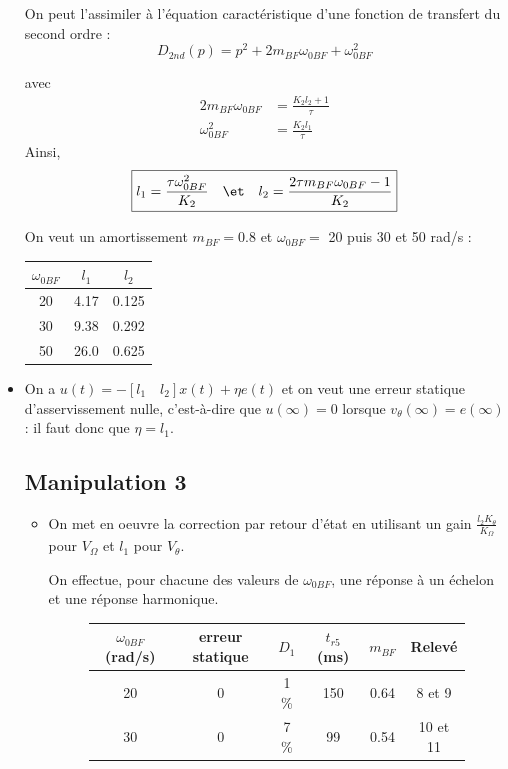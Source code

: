 \documentclass[../../Cours_M1.tex]{subfiles}
\begin{document}
\begin{itemize}
On peut l'assimiler à l'équation caractéristique d'une fonction de transfert du second ordre :
\[D_{2nd}(p) = p^2 + 2m_{BF}\omega_{0BF} + \omega_{0BF}^2\]

avec
\begin{align*}
2m_{BF}\omega_{0BF} & = \frac{K_2l_2 +1}{\tau} \\
\omega_{0BF}^2 & =  \frac{K_2l_1}{\tau}
\end{align*}
Ainsi,
\[ \boxed{ l_1 = \frac{\tau \omega_{0BF}^2}{K_2} \quad \et \quad l_2 = \frac{2\tau m_{BF} \omega_{0BF}-1}{K_2} } \]

On veut un amortissement $m_{BF} = 0.8$ et $\omega_{0BF} = $ 20 puis 30 et 50 rad/s :\\

\begin{center}
\begin{tabular}{|c|c|c|}
\hline 
$\omega_{0BF}$ & $l_1$ & $l_2$ \\ 
\hline 
20 & 4.17 & 0.125 \\ 
30 & 9.38 & 0.292 \\ 
50 & 26.0 & 0.625 \\ 
\hline
\end{tabular}
\end{center} 

\item On a $u(t) = -[l_1 \quad l_2]x(t) + \eta e(t)$ et on veut une erreur statique d'asservissement nulle, c'est-à-dire que $u(\infty) = 0$ lorsque $v_{\theta}(\infty) = e(\infty)$ : il faut donc que $\eta = l_1$.

\subsection*{Manipulation 3}
\begin{itemize}\setlength{\itemsep}{10mm}
\item On met en oeuvre la correction par retour d'état en utilisant un gain $\frac{l_2K_{\theta}}{K_{\Omega}}$ pour $V_{\Omega}$ et $l_1$ pour $V_{\theta}$.

On effectue, pour chacune des valeurs de $\omega_{0BF}$, une réponse à un échelon et une réponse harmonique.
\begin{figure}[h!]
\centering
\begin{tabular}{|c|c|c|c|c|c|}
\hline 
$\omega_{0BF}$ (rad/s) & erreur statique & $D_1$ & $t_{r5}$ (ms) & $m_{BF}$ & Relevé \\ 
\hline 
20 & 0 & 1  \% & 150 & 0.64 & 8 et 9 \\ 
\hline 
30 & 0 & 7 \% & 99 & 0.54 & 10 et 11 \\ 
\hline 
\end{tabular} 
\end{figure}


\end{itemize}
\end{itemize}
\end{document}
